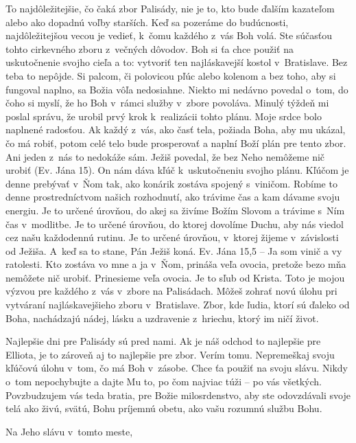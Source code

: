 To najdôležitejšie, čo čaká zbor Palisády, nie je to, kto bude ďalším kazateľom alebo ako dopadnú voľby starších. Keď sa pozeráme do budúcnosti, najdôležitejšou vecou je vedieť, k~čomu každého z~vás Boh volá. Ste súčasťou tohto cirkevného zboru z~večných dôvodov. Boh si ťa chce použiť na uskutočnenie svojho cieľa a to: vytvoriť ten najláskavejší kostol
v~Bratislave. Bez teba to nepôjde. Si palcom, či polovicou pľúc alebo kolenom a bez toho, aby si fungoval naplno, sa Božia vôľa nedosiahne. Niekto mi nedávno povedal o~tom, do čoho si myslí, že ho Boh v~rámci služby v~zbore povoláva. Minulý týždeň mi poslal správu, že urobil prvý krok k~realizácii tohto plánu. Moje srdce bolo naplnené radosťou.
Ak každý z~vás, ako časť tela, požiada Boha, aby mu ukázal, čo má robiť, potom celé telo bude prosperovať a naplní Boží plán pre tento zbor. Ani jeden z~nás to nedokáže sám.
Ježiš povedal, že bez Neho nemôžeme nič urobiť (Ev. Jána 15). On nám dáva kľúč k~uskutočneniu svojho plánu. Kľúčom je denne prebývať v~Ňom tak, ako konárik zostáva spojený s~viničom. Robíme to denne prostredníctvom našich rozhodnutí, ako trávime čas a kam dávame svoju energiu. Je to určené úrovňou, do akej sa živíme Božím Slovom a trávime s~Ním čas v~modlitbe. Je to určené úrovňou, do ktorej dovolíme Duchu, aby nás viedol cez našu každodennú rutinu. Je to určené úrovňou, v~ktorej žijeme v~závislosti od Ježiša. A~keď sa to stane, Pán Ježiš koná. Ev. Jána 15,5 -- Ja som vinič a vy ratolesti. Kto zostáva vo mne a ja v~Ňom, prináša veľa ovocia, pretože bezo mňa nemôžete nič urobiť. Prinesieme veľa ovocia. Je to sľub od Krista. Toto je mojou výzvou pre každého z~vás v~zbore na Palisádach. Môžeš zohrať novú úlohu pri vytváraní najláskavejšieho zboru v~Bratislave. Zbor, kde ľudia, ktorí sú ďaleko od Boha, nachádzajú nádej, lásku a uzdravenie z~hriechu, ktorý im ničí život.

Najlepšie dni pre Palisády sú pred nami. Ak je náš odchod to najlepšie pre Elliota, je to zároveň aj to najlepšie pre zbor. Verím tomu. Nepremeškaj svoju kľúčovú úlohu v~tom, čo má Boh v~zásobe. Chce ťa použiť na svoju slávu. Nikdy o~tom nepochybujte a dajte Mu to, po čom najviac túži -- po vás všetkých. Povzbudzujem vás teda bratia, pre Božie milosrdenstvo, aby ste odovzdávali svoje telá ako živú, svätú, Bohu príjemnú obetu, ako vašu rozumnú službu Bohu.

Na Jeho slávu v~tomto meste,





